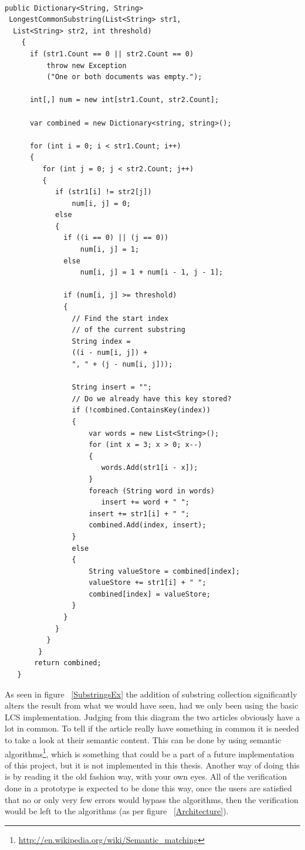 \lstset{style=sharpc}
\begin{lstlisting}[caption=Modified version of LCS, captionpos=b]

public Dictionary<String, String>
 LongestCommonSubstring(List<String> str1,
  List<String> str2, int threshold)
    {
	  if (str1.Count == 0 || str2.Count == 0)
	      throw new Exception
	      ("One or both documents was empty.");

      int[,] num = new int[str1.Count, str2.Count];

      var combined = new Dictionary<string, string>();

      for (int i = 0; i < str1.Count; i++)
      {
         for (int j = 0; j < str2.Count; j++)
         {
            if (str1[i] != str2[j])
                num[i, j] = 0;
            else
            {
              if ((i == 0) || (j == 0))
                  num[i, j] = 1;
              else
                  num[i, j] = 1 + num[i - 1, j - 1];

              if (num[i, j] >= threshold)
              {
                // Find the start index 
                // of the current substring
                String index = 
                ((i - num[i, j]) + 
                ", " + (j - num[i, j]));

                String insert = "";
                // Do we already have this key stored?
                if (!combined.ContainsKey(index))
                {
                    var words = new List<String>();
                    for (int x = 3; x > 0; x--)
                    {
                       words.Add(str1[i - x]);
                    }
                    foreach (String word in words)
                       insert += word + " ";
                    insert += str1[i] + " ";
                    combined.Add(index, insert);
                }
                else
                {
                    String valueStore = combined[index];
                    valueStore += str1[i] + " ";
                    combined[index] = valueStore;
                }
              }
            }
          }
        }
       return combined;
   }

\end{lstlisting}



As seen in figure ~\ref{SubstringsEx} the addition of substring collection significantly alters the result from what we would have seen, had we only been using the basic LCS implementation. Judging from this diagram the two articles obviously have a lot in common. To tell if the article really have something in common it is needed to take a look at their semantic content. This can be done by using semantic algorithms\footnote{\url{http://en.wikipedia.org/wiki/Semantic_matching}}, which is something that could be a part of a future implementation of this project, but it is not implemented in this thesis. Another way of doing this is by reading it the old fashion way, with your own eyes.  All of the verification done in a prototype is expected to be done this way, once the users are satisfied that no or only very few errors would bypass the algorithms, then the verification would be left to the algorithms (as per figure ~\ref{Architecture}). 


